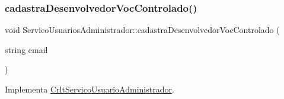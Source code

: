 \subsubsection{\texorpdfstring{cadastra\+Desenvolvedor\+Voc\+Controlado()}{cadastraDesenvolvedorVocControlado()}}
{\footnotesize\ttfamily void Servico\+Usuarios\+Administrador\+::cadastra\+Desenvolvedor\+Voc\+Controlado (\begin{DoxyParamCaption}\item[{string}]{email }\end{DoxyParamCaption})\hspace{0.3cm}{\ttfamily [virtual]}}



Implementa \mbox{\hyperlink{class_crlt_servico_usuario_administrador_ac0432bf5b0788a20f018781bcca74e45}{Crlt\+Servico\+Usuario\+Administrador}}.


